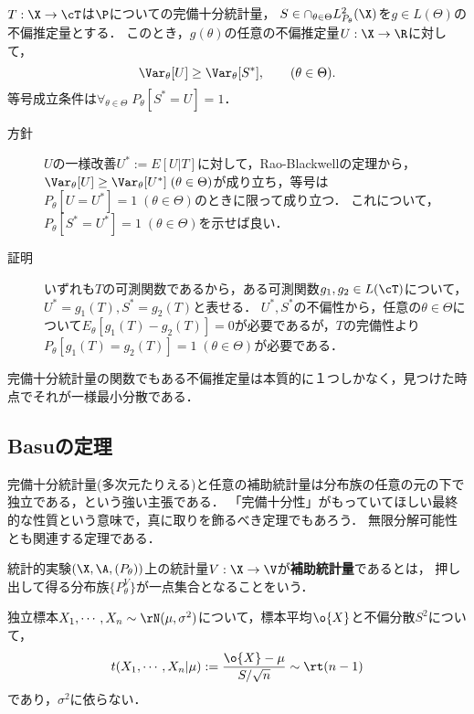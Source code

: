 \documentclass[uplatex,dvipdfmx]{jsreport}
\begin{document}
\begin{theorem}
    $T:\X\to\cT$は$\P$についての完備十分統計量，
    $S\in \cap_{\theta\in\Theta}L^2_{P_\theta}(\X)$を$g\in L(\Theta)$の不偏推定量とする．
    このとき，$g(\theta)$の任意の不偏推定量$U:\X\to\R$に対して，
    \[\Var_\theta[U]\ge\Var_\theta[S^*],\qquad(\theta\in\Theta).\]
    等号成立条件は$\forall_{\theta\in\Theta}\;P_\theta[S^*=U]=1$．
\end{theorem}
\begin{Proof}\mbox{}
    \begin{description}
        \item[方針] $U$の一様改善$U^*:=E[U|T]$に対して，Rao-Blackwellの定理から，$\Var_\theta[U]\ge\Var_\theta[U^*]\;(\theta\in\Theta)$が成り立ち，等号は$P_\theta[U=U^*]=1\;(\theta\in\Theta)$のときに限って成り立つ．
        これについて，$P_\theta[S^*=U^*]=1\;(\theta\in\Theta)$を示せば良い．
        \item[証明] いずれも$T$の可測関数であるから，ある可測関数$g_1,g_2\in L(\cT)$について，$U^*=g_1(T),S^*=g_2(T)$と表せる．
        $U^*,S^*$の不偏性から，任意の$\theta\in\Theta$について$E_\theta[g_1(T)-g_2(T)]=0$が必要であるが，$T$の完備性より$P_\theta[g_1(T)=g_2(T)]=1\;(\theta\in\Theta)$が必要である．
    \end{description}
\end{Proof}
\begin{remarks}
    完備十分統計量の関数でもある不偏推定量は本質的に１つしかなく，見つけた時点でそれが一様最小分散である．
\end{remarks}

\subsection{Basuの定理}

\begin{tcolorbox}[colframe=ForestGreen, colback=ForestGreen!10!white,breakable,colbacktitle=ForestGreen!40!white,coltitle=black,fonttitle=\bfseries\sffamily,
title=]
    完備十分統計量(多次元たりえる)と任意の補助統計量は分布族の任意の元の下で独立である，という強い主張である．
    「完備十分性」がもっていてほしい最終的な性質という意味で，真に取りを飾るべき定理でもあろう．
    無限分解可能性とも関連する定理である．
\end{tcolorbox}

\begin{definition}
    統計的実験$(\X,\A,(P_\theta))$上の統計量$V:\X\to\V$が\textbf{補助統計量}であるとは，
    押し出して得る分布族$\{P_\theta^V\}$が一点集合となることをいう．
\end{definition}
\begin{example}
    独立標本$X_1,\cdots,X_n\sim\rN(\mu,\sigma^2)$について，標本平均$\o{X}$と不偏分散$S^2$について，
    \[t(X_1,\cdots,X_n|\mu):=\frac{\o{X}-\mu}{S/\sqrt{n}}\sim\rt(n-1)\]
    であり，$\sigma^2$に依らない．
\end{example}
\end{document}
